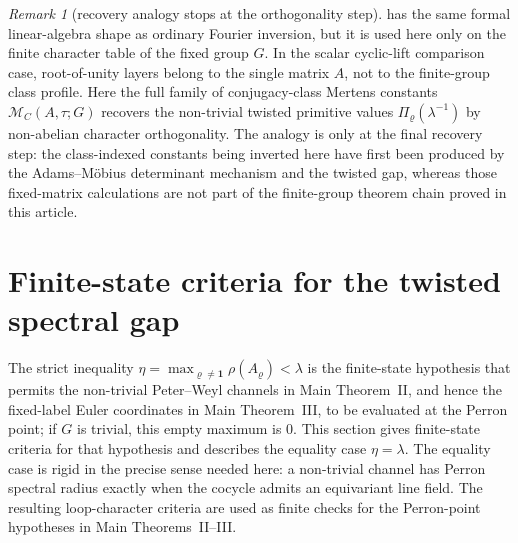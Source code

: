 \documentclass[11pt,a4paper]{amsart}
\theoremstyle{plain}
\theoremstyle{definition}
\theoremstyle{remark}
\newtheorem{remark}[theorem]{Remark}
\begin{document}
\begin{remark}[recovery analogy stops at the orthogonality step]
  \label{rem:recovery-analogy-orthogonality-step}
  \label{rem:readout-analogy-orthogonality-step}
   has the same formal linear-algebra
  shape as ordinary Fourier inversion, but it is used here only on the
  finite character table of the fixed group \(G\).  In the scalar
  cyclic-lift comparison case, root-of-unity layers belong to the single
  matrix \(A\), not to the finite-group class profile.
  Here the full family of
  conjugacy-class Mertens constants \(\mathcal M_C(A,\tau;G)\) recovers
  the non-trivial twisted
  primitive values \(\Pi_\varrho(\lambda^{-1})\) by non-abelian
  character orthogonality. The analogy is only at the final recovery
  step: the class-indexed constants being inverted here have first been
  produced by the
  Adams--M\"obius determinant mechanism and the twisted gap, whereas
  those fixed-matrix calculations are not part of the finite-group theorem
  chain proved in this article.
\end{remark}
\section{Finite-state criteria for the twisted spectral gap}
\label{sec:eta-gap}

The strict inequality
\(\eta=\max_{\varrho\neq\mathbf 1}\rho(A_\varrho)<\lambda\) is the
finite-state hypothesis that permits the non-trivial Peter--Weyl channels in
Main Theorem~II, and hence the fixed-label Euler coordinates in Main
Theorem~III, to be evaluated at the Perron point; if \(G\) is trivial, this
empty maximum is \(0\).  This section gives finite-state criteria for that hypothesis and describes the equality case
\(\eta=\lambda\).  The equality case is rigid in the precise sense needed
here: a non-trivial channel has Perron spectral radius exactly when the
cocycle admits an equivariant line field.  The resulting loop-character
criteria are used as finite checks for the Perron-point hypotheses in Main
Theorems~II--III.
\end{document}
